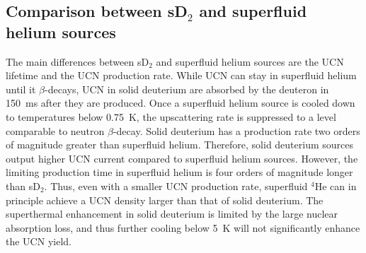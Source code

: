 %

\subsection{Comparison between sD$_2$ and superfluid helium sources}

The main differences between sD$_2$ and superfluid helium sources are
the UCN lifetime and the UCN production rate. While UCN can stay in
superfluid helium until it $\beta$-decays, UCN in solid deuterium are
absorbed by the deuteron in 150~ms after they are produced.  Once a
superfluid helium source is cooled down to temperatures below 0.75~K,
the upscattering rate is suppressed to a level comparable to neutron
$\beta$-decay.  Solid deuterium has a production rate two orders of
magnitude greater than superfluid helium. Therefore, solid deuterium
sources output higher UCN current compared to superfluid helium
sources. However, the limiting production time in superfluid helium is
four orders of magnitude longer than sD$_2$. Thus, even with a smaller
UCN production rate, superfluid $^4$He can in principle achieve a UCN
density larger than that of solid deuterium.  The superthermal
enhancement in solid deuterium is limited by the large nuclear
absorption loss, and thus further cooling below 5~K will not
significantly enhance the UCN yield.







